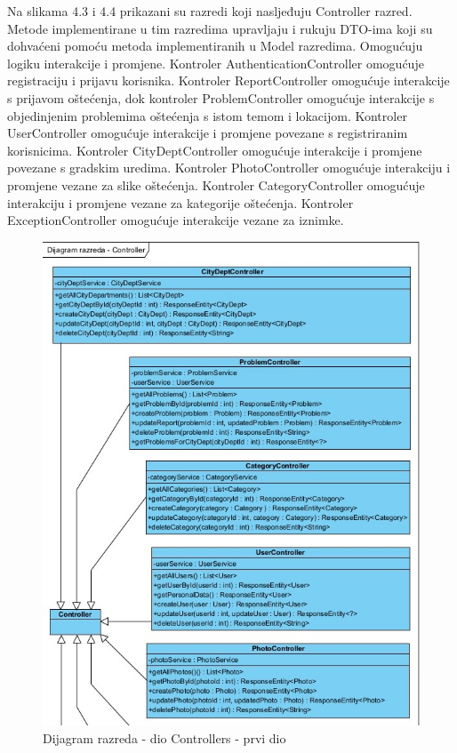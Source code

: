 Na slikama 4.3 i 4.4 prikazani su razredi koji nasljeđuju Controller razred. Metode implementirane u tim razredima
upravljaju i rukuju DTO-ima koji su dohvaćeni pomoću metoda implementiranih u Model razredima. Omogućuju
logiku interakcije i promjene. Kontroler AuthenticationController omogućuje registraciju i prijavu korisnika.
Kontroler ReportController omogućuje interakcije s prijavom oštećenja, dok kontroler ProblemController omogućuje
interakcije s objedinjenim problemima oštećenja s istom temom i lokacijom. Kontroler UserController omogućuje
interakcije i promjene povezane s registriranim korisnicima. Kontroler CityDeptController omogućuje
interakcije i promjene povezane s gradskim uredima. Kontroler PhotoController omogućuje interakciju i promjene
vezane za slike oštećenja. Kontroler CategoryController omogućuje interakciju i promjene vezane za
kategorije oštećenja. Kontroler ExceptionController omogućuje interakcije vezane za iznimke.

\begin{figure}[H]
	\includegraphics[scale=1.0]{slike/DR-controller1} %
	\centering
	\caption{Dijagram razreda - dio Controllers - prvi dio}
	\label{fig:DijagramRazredaControllers}
\end{figure}

